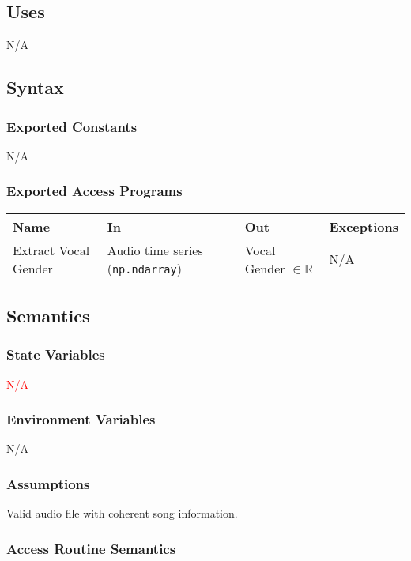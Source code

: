 \documentclass[12pt, titlepage]{article}
\begin{document}
\subsection{Uses}
N/A

\subsection{Syntax}

\subsubsection{Exported Constants}
N/A

\subsubsection{Exported Access Programs}

\begin{center}
\begin{tabular}{p{2cm} p{4cm} p{4cm} p{2cm}}
\hline
\textbf{Name} & \textbf{In} & \textbf{Out} & \textbf{Exceptions}\\
\hline%
Extract Vocal Gender &Audio time series (\texttt{np.ndarray}) &Vocal Gender $\in \mathbb{R}$ &N/A\\
\hline
\end{tabular}
\end{center}

\subsection{Semantics}

\subsubsection{State Variables}
\textcolor{red}{N/A}

\subsubsection{Environment Variables}
N/A

\subsubsection{Assumptions}
Valid audio file with coherent song information.

\subsubsection{Access Routine Semantics}
\end{document}
